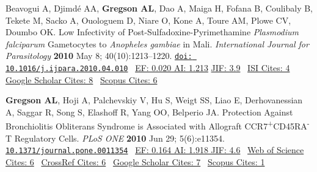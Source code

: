 \documentclass[12pt]{moderncv} %
\newcommand{\txsp}[1]{\textsuperscript{#1}}
\begin{document}
\begin{thebibliography}{1}
  \bibitem[15]{} Beavogui A, Djimd\'{e} AA, \textbf{Gregson AL}, Dao A, Maiga H, Fofana B, Coulibaly B, Tekete M, Sacko A, Ouologuem D, Niare O, Kone A, Toure AM, Plowe CV, Doumbo OK. Low Infectivity of Post-Sulfadoxine-Pyrimethamine \textit{Plasmodium falciparum} Gametocytes to \textit{Anopheles gambiae} in Mali. {\color{journalcolor}\textit{International Journal for Parasitology}} \textbf{2010} May 8; 40(10):1213--1220. \href{http://dx.doi.org/10.1016/j.ijpara.2010.04.010}{\nolinkurl{doi: 10.1016/j.ijpara.2010.04.010}}~ 
      {\color{subsectioncolor}\href{http://www.eigenfactor.org/rankings.php?search=INTERNATIONAL+JOURNAL+FOR+PARASITOLOGY&search2=&search3=&searchby=journal}{{\smaller EF: 0.020 AI: 1.213}}
         \href{http://admin-apps.webofknowledge.com/JCR/JCR?RQ=RECORD&rank=1&journal=INT+J+PARASITOL}{{\smaller JIF: 3.9}}~
         \href{http://apps.webofknowledge.com/CitedFullRecord.do?product=WOS&colName=WOS&SID=4AG6pnd7daKF6IABJdC&search_mode=CitedFullRecord&isickref=WOS:000280013000014}{{\smaller ISI Cites: 4}}~ 
         \href{http://scholar.google.com/scholar?cites=13371683552743464380&as_sdt=2005&sciodt=0,5&hl=en}{{\smaller Google Scholar Cites: 8}}~
         \href{http://www.scopus.com/record/display.url?eid=2-s2.0-77954028849&origin=inward&txGid=2728424DD3A06399B3857C04F09A7B4B.N5T5nM1aaTEF8rE6yKCR3A%3a12}{{\smaller Scopus Cites: 6}}
         }

  \bibitem[16]{} \textbf{Gregson AL}, Hoji A, Palchevskiy V, Hu S, Weigt SS, Liao E, Derhovanessian A, Saggar R, Song S, Elashoff R, Yang OO, Belperio JA. Protection Against Bronchiolitis Obliterans Syndrome is Associated with Allograft {\smaller CCR}7\txsp{+}{\smaller CD}45RA\txsp{-} T Regulatory Cells. {\color{journalcolor}\textit{PLoS {\smaller ONE}}} \textbf{2010} Jun 29; 5(6):e11354. \href{http://dx.plos.org/10.1371/journal.pone.0011354}{\nolinkurl{10.1371/journal.pone.0011354}}~ 
    {\color{subsectioncolor} \href{http://admin-apps.isiknowledge.com/JCR/JCR?RQ=RECORD&rank=6&journal=PLOS+ONE}{{\smaller EF: 0.164 AI: 1.918  JIF: 4.6}}~ 
      \href{http://apps.webofknowledge.com/InboundService.do?UT=000279369900006&viewType=summary&IsProductCode=Yes&mode=CitingArticles&product=WOS&SID=4EiICf1kgi9aeK5678i&SrcApp=CR&DestFail=http%3A%2F%2Fwww.webofknowledge.com%3FDestApp%3DCEL%26DestParams%3D%253Faction%253Dsearch%2526viewType%253Dsummary%2526mode%253DCitingArticles%2526product%253DCEL%2526UT%253D000279369900006%2526customersID%253DPLoSCEL%26e%3DbB6I681LlpfP3olFu.qCS02EHi6qOOV2JVrz_dPAp8J5YKJXSr9B4qnZB6dOuxSn%26SrcApp%3DPARTNER_APP%26SrcAuth%3DPLoSCEL&action=search&Init=Yes&SrcAuth=PLoSCEL&customersID=PLoSCEL&Func=Frame}{{\smaller Web of Science Cites: 6}}~
      \href{http://www.plosone.org/article/crossref/info%3Adoi%2F10.1371%2Fjournal.pone.0011354}{{\smaller CrossRef Cites: 6}}~
      \href{http://scholar.google.com/scholar?cites=17706160008567303104&as_sdt=2005&sciodt=0,5&hl=en}{{\smaller Google Scholar Cites: 7}}~
      \href{http://www.scopus.com/record/display.url?eid=2-s2.0-77956216912&origin=inward&txGid=2728424DD3A06399B3857C04F09A7B4B.N5T5nM1aaTEF8rE6yKCR3A%3a10}{{\smaller Scopus Cites: 1}}
      }


\end{thebibliography}
\end{document}
